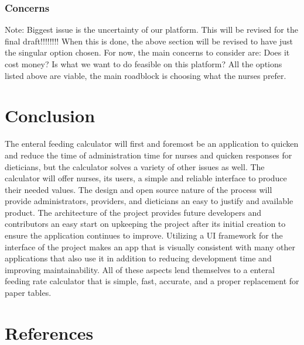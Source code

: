 \documentclass[onecolumn, draftclsnofoot,10pt, compsoc]{IEEEtran}
\begin{document}
\subsubsection{Concerns}
Note: Biggest issue is the uncertainty of our platform. This will be revised for the final draft!!!!!!!! When this is done, the above section will be revised to have just the singular option chosen.
\newline
For now, the main concerns to consider are: Does it cost money? Is what we want to do feasible on this platform? All the options listed above are viable, the main roadblock is choosing what the nurses prefer.

\section{Conclusion}
The enteral feeding calculator will first and foremost be an application to quicken and reduce the time of administration time for nurses and quicken responses for dieticians, but the calculator solves a variety of other issues as well.
The calculator will offer nurses, its users, a simple and reliable interface to produce their needed values.
The design  and open source nature of the process will provide administrators, providers, and dieticians an easy to justify and available product.
The architecture of the project provides future developers and contributors an easy start on upkeeping the project after its initial creation to ensure the application continues to improve.
Utilizing a UI framework for the interface of the project makes an app that is visually consistent with many other applications that also use it in addition to reducing development time and improving maintainability.
All of these aspects lend themselves to a enteral feeding rate calculator that is simple, fast, accurate, and a proper replacement for paper tables.
\printbibliography[title=\section{References}]
\section{References}
\end{document}
